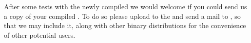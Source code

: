 After some tests with the newly compiled \period we would welcome if you
could send us a copy of your compiled \period.
To do so please upload to the 
and send a mail to \periodmail, 
so that we may include it, along with other binary distributions 
for the convenience of other potential users.


